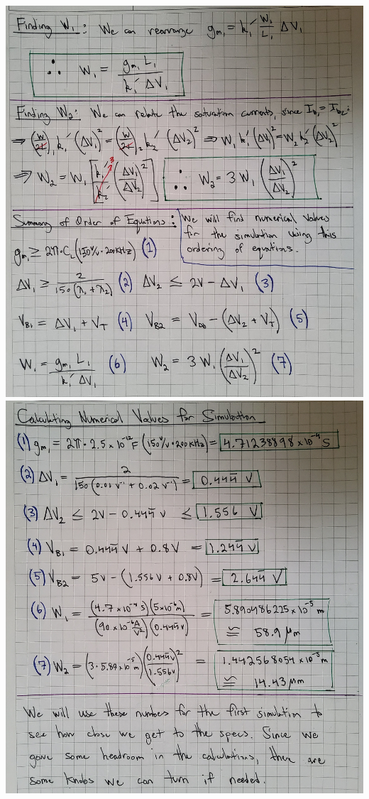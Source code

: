 \documentclass[12pt, fleqn]{article}
\begin{document}
\newpage
\includegraphics[scale=0.165, angle=90, center]{p2a_6.jpg}\\
\newpage
\includegraphics[scale=0.165, angle=90, center]{p2a_7.jpg}\\
\end{document}
